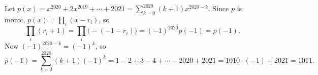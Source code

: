 Let $p(x)=x^{2020}+2x^{2019}+\cdots+2021=\sum_{k=0}^{2020}(k+1)x^{2020-k}$. Since $p$ is monic, $p(x)=\prod_{i}(x-r_i)$, so
\[
\prod_i(r_i+1)=\prod_i\bigl(-(-1-r_i)\bigr)=(-1)^{2020}p(-1)=p(-1).
\]
Now $(-1)^{2020-k}=(-1)^k$, so
\[
p(-1)=\sum_{k=0}^{2020}(k+1)(-1)^k=1-2+3-4+\cdots-2020+2021=1010\cdot(-1)+2021=\boxed{1011}.
\]
